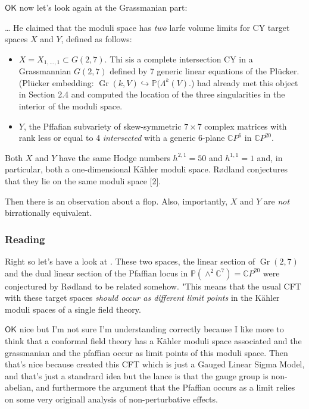 $\mathsf{OK}$ now let's look again at the Grassmanian part:

{\color{7}… He claimed that the moduli space has \textit{two} larfe volume limits for CY target spaces $X$ and $Y$, defined as follows:}
\begin{itemize}
	\item $X=X_{1,\ldots,1}\subset G(2,7)$. Thi sis a complete intersection CY in a Grassmannian $G(2,7)$ defined by 7 generic linear equations of the Plücker. (Plücker embedding: $\operatorname{Gr}(k,V)\hookrightarrow \mathbb{P}(\Lambda^{k}(V)$.)  \cite{hot} had already met this object in Section 2.4 and computed the location of the three singularities in the interior of the moduli space.
	\item $Y$, the Pffafian subvariety of skew-symmetric $7\times 7$ complex matrices with rank less or equal to 4 \textit{intersected} with a generic 6-plane $\mathbb{C}P^{6}$ in $\mathbb{C}P^{20}$.
\end{itemize}
Both $X$ and $Y$ have the same Hodge numbers $h^{2,1}=50$ and $h^{1,1}=1$ and, in particular, both a one-dimensional Kähler moduli space. R\o dland conjectures that they lie on the same moduli space [2].

Then there is an observation about a flop. Also, importantly, $X$ and $Y$ are \textit{not} birrationally equivalent.

\subsubsection{Reading \cite{pfgr}}

Right so let's have a look at \cite{pfgr}. These two spaces, the linear section of $\operatorname{Gr}(2,7)$ and the dual linear section of the Pfaffian locus in $\mathbb{P}(\wedge^2\mathbb{C}^7)=\mathbb{C}P^{20}$ were conjectured by Rødland to {\color{3}be related somehow}. "This means that the usual CFT with these target spaces \textit{should occur as different limit points} in the Kähler moduli spaces of a single field theory.

$\mathsf{OK}$ nice but I'm not sure I'm understanding correctly because I like more to think that a conformal field theory has a Kähler moduli space associated and the grassmanian and the pfaffian occur as limit points of this moduli space. Then that's nice because \cite{hot} created this CFT which is just a Gauged Linear Sigma Model, and that's just a standrard idea but the lance is that the gauge group is non-abelian, and furthermore the argument that the Pfaffian occurs as a limit relies on some very originall analysis of non-perturbative effects.

